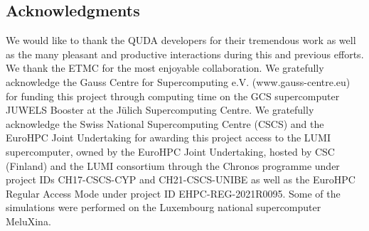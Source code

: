 \documentclass[a0,portrait]{a0poster}
\begin{document}
\begin{multicols}{2}

    \subsection*{Acknowledgments}
    \small 
    We would like to thank the QUDA developers for their tremendous work as well as the many pleasant and productive
    interactions during this and previous efforts. We thank the ETMC for the most enjoyable collaboration. 
    We gratefully acknowledge the Gauss Centre for Supercomputing e.V. (www.gauss-centre.eu) for funding this project through computing time on the GCS supercomputer JUWELS Booster at the Jülich Supercomputing Centre.
    We gratefully acknowledge the Swiss National Supercomputing Centre (CSCS) and the EuroHPC Joint Undertaking for awarding this project access to the LUMI supercomputer, owned by the EuroHPC Joint Undertaking, hosted by CSC (Finland) and the LUMI consortium through the Chronos programme under project IDs CH17-CSCS-CYP and CH21-CSCS-UNIBE as well as the EuroHPC Regular Access Mode under project ID EHPC-REG-2021R0095. 
    Some of the simulations were performed on the Luxembourg national supercomputer MeluXina.



\end{multicols}
\end{document}
